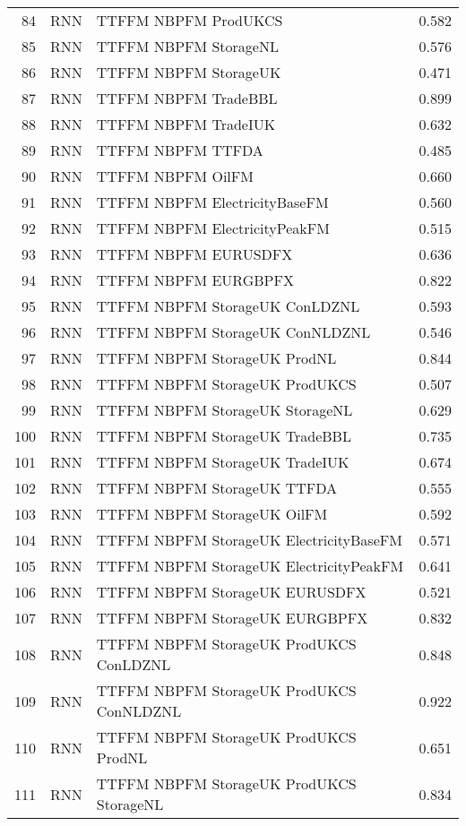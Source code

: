 \begin{table}[ht]
\begin{tabular}{rllr}
  84 & RNN & TTFFM NBPFM ProdUKCS & 0.582 \\ 
  85 & RNN & TTFFM NBPFM StorageNL & 0.576 \\ 
  86 & RNN & TTFFM NBPFM StorageUK & 0.471 \\ 
  87 & RNN & TTFFM NBPFM TradeBBL & 0.899 \\ 
  88 & RNN & TTFFM NBPFM TradeIUK & 0.632 \\ 
  89 & RNN & TTFFM NBPFM TTFDA & 0.485 \\ 
  90 & RNN & TTFFM NBPFM OilFM & 0.660 \\ 
  91 & RNN & TTFFM NBPFM ElectricityBaseFM & 0.560 \\ 
  92 & RNN & TTFFM NBPFM ElectricityPeakFM & 0.515 \\ 
  93 & RNN & TTFFM NBPFM EURUSDFX & 0.636 \\ 
  94 & RNN & TTFFM NBPFM EURGBPFX & 0.822 \\ 
  95 & RNN & TTFFM NBPFM StorageUK ConLDZNL & 0.593 \\ 
  96 & RNN & TTFFM NBPFM StorageUK ConNLDZNL & 0.546 \\ 
  97 & RNN & TTFFM NBPFM StorageUK ProdNL & 0.844 \\ 
  98 & RNN & TTFFM NBPFM StorageUK ProdUKCS & 0.507 \\ 
  99 & RNN & TTFFM NBPFM StorageUK StorageNL & 0.629 \\ 
  100 & RNN & TTFFM NBPFM StorageUK TradeBBL & 0.735 \\ 
  101 & RNN & TTFFM NBPFM StorageUK TradeIUK & 0.674 \\ 
  102 & RNN & TTFFM NBPFM StorageUK TTFDA & 0.555 \\ 
  103 & RNN & TTFFM NBPFM StorageUK OilFM & 0.592 \\ 
  104 & RNN & TTFFM NBPFM StorageUK ElectricityBaseFM & 0.571 \\ 
  105 & RNN & TTFFM NBPFM StorageUK ElectricityPeakFM & 0.641 \\ 
  106 & RNN & TTFFM NBPFM StorageUK EURUSDFX & 0.521 \\ 
  107 & RNN & TTFFM NBPFM StorageUK EURGBPFX & 0.832 \\ 
  108 & RNN & TTFFM NBPFM StorageUK ProdUKCS ConLDZNL & 0.848 \\ 
  109 & RNN & TTFFM NBPFM StorageUK ProdUKCS ConNLDZNL & 0.922 \\ 
  110 & RNN & TTFFM NBPFM StorageUK ProdUKCS ProdNL & 0.651 \\ 
  111 & RNN & TTFFM NBPFM StorageUK ProdUKCS StorageNL & 0.834 \\ 

\end{tabular}
\end{table}
